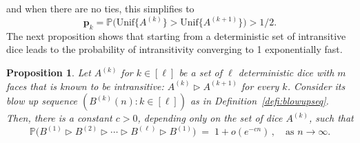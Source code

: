 \documentclass[reqno,a4paper,11pt]{amsart}
\newcommand{\btt}{\triangleright}
\newtheorem{proposition}[lemma]{Proposition}
\theoremstyle{remark}
\newcommand{\mb}[1]{{\mathbf #1}}
\newcommand{\bb}[1]{{\mathbb #1}}
\numberwithin{equation}{section}
\begin{document}
and when there are no ties, this simplifies to 
$$\mb p_k = \mathbb P\bigl(\text{Unif}\{A^{(k)}\} > \text{Unif}\{A^{(k+1)}\}\bigr) > 1/2.$$
The next proposition shows that starting from a deterministic set of
intransitive dice leads to the probability of intransitivity converging
to 1 exponentially fast.
\begin{proposition}
	\label{prop:asymp_intransitive_example}
	Let $A^{(k)}$ for $k \in [\ell]$ be a set of $\ell$ deterministic dice
    with $m$ faces that is known to be intransitive:
	$A^{(k)} \btt A^{(k+1)}$ for every $k$. Consider its blow up sequence
    $(B^{(k)}(n): k \in [\ell])$ as in Definition~\ref{defi:blowupseq}.
    Then, there is a constant $c > 0$, depending
	only on the set of dice $A^{(k)}$, such that
	\begin{equation}
	\label{eq:asymp_intransitive_example}
	\bb P\big(B^{(1)} \btt B^{(2)} \btt \cdots \btt B^{(\ell)} \btt B^{(1)}\big)
	\;=\; 1 + o(e^{-cn})\,, \quad \text{as $n \to \infty$}.
	\end{equation}
\end{proposition}
\end{document}
